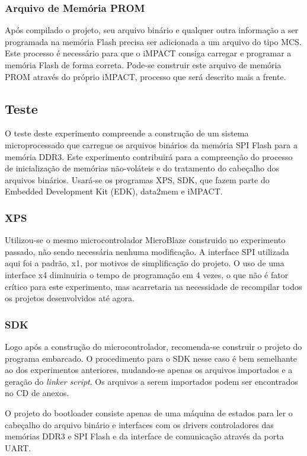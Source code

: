\documentclass[11pt,a4paper,oneside]{book}
\begin{document}
\subsubsection{Arquivo de Memória PROM}
Após compilado o projeto, seu arquivo binário e qualquer outra informação a ser programada na memória Flash precisa ser adicionada a um arquivo do tipo MCS.
Este processo é necessário para que o iMPACT consiga carregar e programar a memória Flash de forma correta.
Pode-se construir este arquivo de memória PROM através do próprio iMPACT, processo que será descrito mais a frente.

\subsection{Teste}
O teste deste experimento compreende a construção de um sistema microprocessado que carregue os arquivos binários da memória SPI Flash para a memória DDR3.
Este experimento contribuirá para a compreenção do processo de inicialização de memórias não-voláteis e do tratamento do cabeçalho dos arquivos binários.
Usará-se os programas XPS, SDK, que fazem parte do Embedded Development Kit (EDK), data2mem e iMPACT.

\subsubsection{XPS}
Utilizou-se o mesmo microcontrolador MicroBlaze construido no experimento passado, não sendo necessária nenhuma modificação.
A interface SPI utilizada aqui foi a padrão, x1, por motivos de simplificação do projeto.
O uso de uma interface x4 diminuiria o tempo de programação em 4 vezes, o que não é fator crítico para este experimento, mas acarretaria na necessidade de recompilar todos os projetos desenvolvidos até agora.

\subsubsection{SDK}
Logo após a construção do microcontrolador, recomenda-se construir o projeto do programa embarcado.
O procedimento para o SDK nesse caso é bem semelhante ao dos experimentos anteriores, mudando-se apenas os arquivos importados e a geração do \textit{linker script}.
Os arquivos a serem importados podem ser encontrados no CD de anexos.

O projeto do bootloader consiste apenas de uma máquina de estados para ler o cabeçalho do arquivo binário e interfaces com os drivers controladores das memórias DDR3 e SPI Flash e da interface de comunicação através da porta UART.
\end{document}
